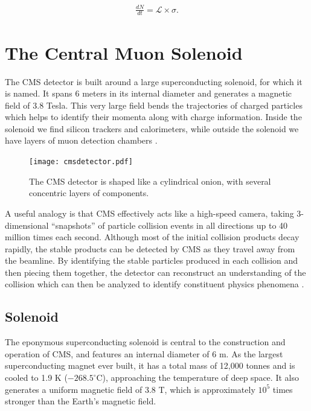 \begin{equation}
\label{eq:crosssection}
\begin{gathered}
\frac{dN}{dt} = \mathcal{L} \times \sigma.
\end{gathered}
\end{equation}



\section{The Central Muon Solenoid} \label{chap:chap-3.2-CMS}
The CMS detector is built around a large superconducting solenoid, for which it is named. It spans 6 meters in its internal diameter and generates a magnetic field of 3.8 Tesla. This very large field bends the trajectories of charged particles which helps to identify their momenta along with charge information. Inside the solenoid we find silicon trackers and calorimeters, while outside the solenoid we have layers of muon detection chambers \cite{CMStechprop, The_CMS_Collaboration_2008, Contardo:2020886}.

\begin{figure}[!ht]
\begin{center}
    \texttt{[image: cmsdetector.pdf]}
    \caption{The CMS detector is shaped like a cylindrical onion, with several concentric layers of components.}
    \label{fig:cmscutaway1}
\end{center}
\end{figure}

A useful analogy is that CMS effectively acts like a high-speed camera, taking 3-dimensional ``snapshots'' of particle collision events in all directions up to 40 million times each second. Although most of the initial collision products decay rapidly, the stable products can be detected by CMS as they travel away from the beamline. By identifying the stable particles produced in each collision and then piecing them together, the detector can reconstruct an understanding of the collision which can then be analyzed to identify constituent physics phenomena \cite{Karimaki:368412, CERN-LHCC-2000-016, Chatrchyan:1129810, Collaboration:2745805, CERN-LHCC-2017-009}.

\subsection{Solenoid}
The eponymous superconducting solenoid is central to the construction and operation of CMS, and features an internal diameter of 6 m. As the largest superconducting magnet ever built, it has a total mass of 12,000 tonnes and is cooled to 1.9 K ($-268.5^\circ$C), approaching the temperature of deep space. It also generates a uniform magnetic field of 3.8 T, which is approximately $10^5$ times stronger than the Earth's magnetic field.

